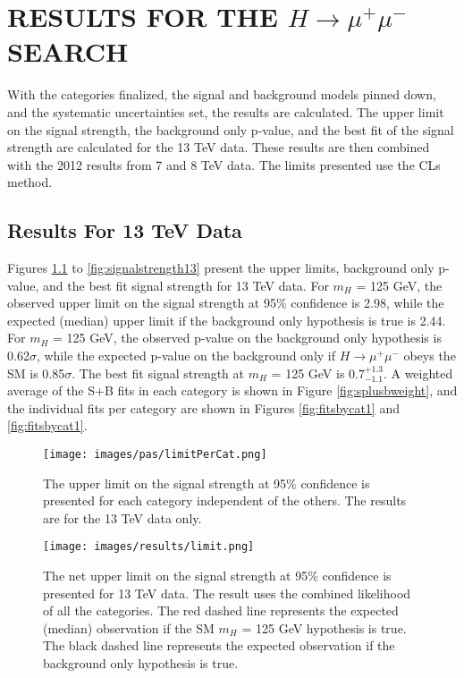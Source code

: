 \chapter{RESULTS FOR THE $H\rightarrow\mu^+\mu^-$ SEARCH} \label{results}

With the categories finalized, the signal and background models pinned down, and the systematic uncertainties set, the results are calculated. The upper limit on the signal strength, the background only p-value, and the best fit of the signal strength are calculated for the 13 TeV data. These results are then combined with the 2012 results from 7 and 8 TeV data. The limits presented use the CLs method.  
\section{Results For 13 TeV Data}
Figures \ref{fig:limitPerCat} to \ref{fig:signalstrength13} present the upper limits, background only p-value, and the best fit signal strength for 13 TeV data. For $m_H$ = 125 GeV, the observed upper limit on the signal strength at 95\% confidence is 2.98, while the expected (median) upper limit if the background only hypothesis is true is 2.44. For $m_H$ = 125 GeV, the observed p-value on the background only hypothesis is 0.62$\sigma$, while the expected p-value on the background only if $H\rightarrow\mu^+\mu^-$ obeys the SM is 0.85$\sigma$. The best fit signal strength at $m_H$ = 125 GeV is $0.7^{+1.3}_{-1.1}$. A weighted average of the S+B fits in each category is shown in Figure \ref{fig:splusbweight}, and the individual fits per category are shown in Figures \ref{fig:fitsbycat1} and \ref{fig:fitsbycat1}. 
\begin{figure}[h!]
    \centering
    \texttt{[image: images/pas/limitPerCat.png]}
    \caption[The upper limit on the signal strength for the individual categories on 13 TeV data alone.]
    {The upper limit on the signal strength at 95\% confidence is presented for each category independent of the others. The results are for the 13 TeV data only.}
    \label{fig:limitPerCat}
\end{figure}
\begin{figure}[h!]
    \centering
    \texttt{[image: images/results/limit.png]}
    \caption[The net upper limit on the signal strength for 13 TeV data alone.]
    {The net upper limit on the signal strength at 95\% confidence is presented for 13 TeV data. The result uses the combined likelihood of all the categories. The red dashed line represents the expected (median) observation if the SM $m_H$ = 125 GeV hypothesis is true. The black dashed line represents the expected observation if the background only hypothesis is true.}
    \label{fig:limit13}
\end{figure}
